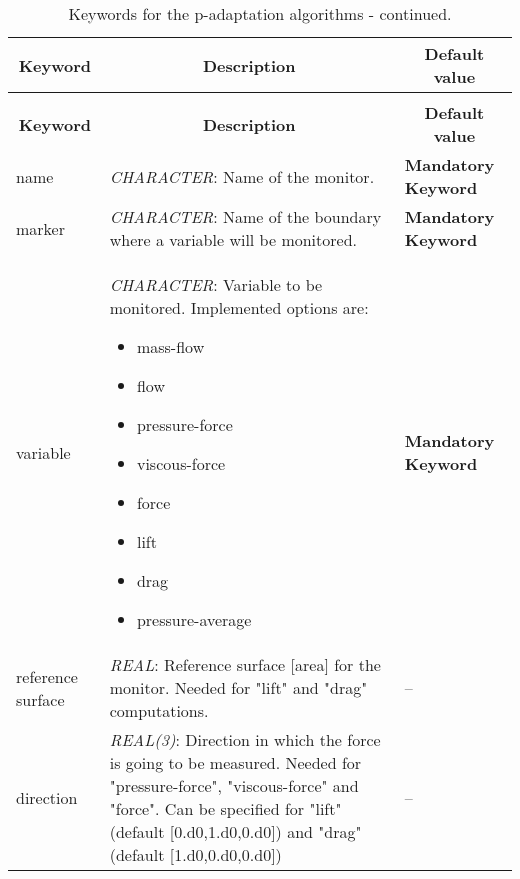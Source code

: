 \documentclass[a4paper,10pt]{report}
\begin{document}
\begin{longtable}{|p{4cm}|p{10cm}|p{2.2cm}|}
\caption{Keywords for probes.} \label{tab:SurfaceMonitorKey} \\
\hline
\multicolumn{1}{|c|}{\textbf{Keyword}} & \multicolumn{1}{c|}{\textbf{Description}} & \multicolumn{1}{c|}{\textbf{Default value}} \\ \hline
\endfirsthead

\caption{Keywords for the p-adaptation algorithms - continued.} \\
\hline
\multicolumn{1}{|c|}{\textbf{Keyword}} & \multicolumn{1}{c|}{\textbf{Description}} & \multicolumn{1}{c|}{\textbf{Default value}} \\ \hline
\endhead

name 	&
			\textit{CHARACTER}: Name of the monitor. &
							\textbf{Mandatory Keyword} \\ \hline

marker &
			\textit{CHARACTER}: Name of the boundary where a variable will be monitored. &
							\textbf{Mandatory Keyword} \\ \hline

variable 	&
			\textit{CHARACTER}: Variable to be monitored. Implemented options are:\
\begin{multicols}{2}
\begin{itemize}
\item mass-flow
\item flow
\item pressure-force
\item viscous-force
\item force
\item lift
\item drag
\item pressure-average
\end{itemize}
\end{multicols}
			 &
							\textbf{Mandatory Keyword} \\ \hline

reference surface 	&
			\textit{REAL}: Reference surface [area] for the monitor. Needed for "lift" and "drag" computations. &
							-- \\ \hline

direction 	&
			\textit{REAL(3)}: Direction in which the force is going to be measured. Needed for "pressure-force", "viscous-force" and "force". Can be specified for "lift" (default [0.d0,1.d0,0.d0]) and "drag" (default [1.d0,0.d0,0.d0])   &
							-- \\ \hline
\end{longtable}
\end{document}
